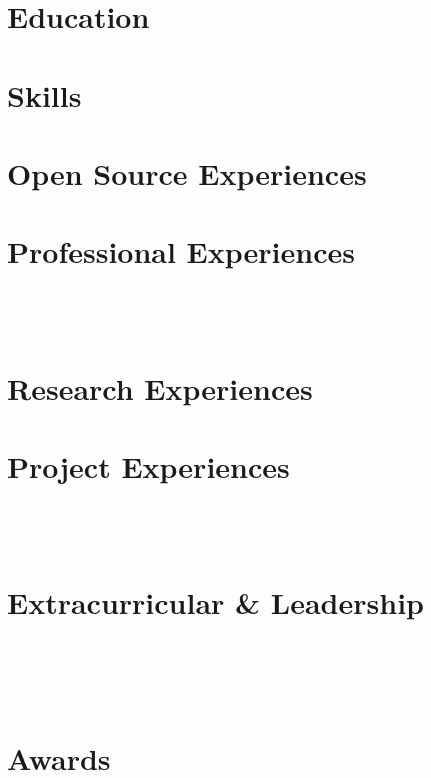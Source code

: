 \documentclass[a4paper,8pt]{article}
\begin{document}


\section{Education}



\section{Skills}


\section{Open Source Experiences}



\section{Professional Experiences}

\\ [2pt]

\\ [2pt]


\section{Research Experiences}


\section{Project Experiences}

\\ [2pt]

\\ [2pt]


\section{Extracurricular \& Leadership}

\\ [2pt]

\\ [2pt]

\\ [2pt]


\section{Awards}

\end{document}
